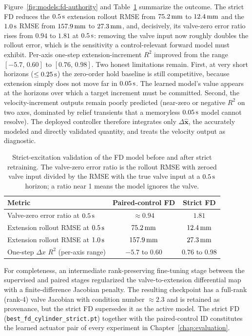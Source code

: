 Figure~\ref{fig:models:fd-authority} and Table~\ref{tab:models:fd-strict}
summarize the outcome. The strict FD reduces the $\unit[0.5]{s}$ extension
rollout RMSE from $\unit[75.2]{mm}$ to $\unit[12.4]{mm}$ and the
$\unit[1.0]{s}$ RMSE from $\unit[157.9]{mm}$ to $\unit[27.3]{mm}$, and, decisively, its valve-zero error ratio rises from $0.94$ to
$1.81$ at $\unit[0.5]{s}$: removing the valve input now roughly doubles the
rollout error, which is the sensitivity a control-relevant forward
model must exhibit. Per-axis one-step extension-increment $R^2$ improved
from the range $[-5.7,\, 0.60]$ to $[0.76,\, 0.98]$. Two honest limitations
remain. First, at very short horizons ($\leq \unit[0.25]{s}$) the zero-order
hold baseline is still competitive, because extension simply does not move
far in $\unit[0.05]{s}$. The learned model's value appears at the horizons
over which a target increment must be committed. Second, the
velocity-increment outputs remain poorly predicted (near-zero or negative
$R^2$ on two axes, dominated by relief transients that a memoryless
$\unit[0.05]{s}$ model cannot resolve). The deployed controller therefore
integrates only $\Delta\hat{\bm{x}}$, the accurately modeled and directly
validated quantity, and treats the velocity output as diagnostic.

\begin{table}[tb]
  \centering
  \caption{Strict-excitation validation of the FD model before and after
  strict retraining. The valve-zero error ratio is the rollout RMSE with
  zeroed valve input divided by the RMSE with the true valve input at a
  $\unit[0.5]{s}$ horizon; a ratio near 1 means the model ignores the valve.}
  \label{tab:models:fd-strict}
  \begin{tabular}{lcc}
    \toprule
    Metric & Paired-control FD & Strict FD \\
    \midrule
    Valve-zero error ratio at $\unit[0.5]{s}$ & $\approx 0.94$ & $1.81$ \\
    Extension rollout RMSE at $\unit[0.5]{s}$ & $\unit[75.2]{mm}$ & $\unit[12.4]{mm}$ \\
    Extension rollout RMSE at $\unit[1.0]{s}$ & $\unit[157.9]{mm}$ & $\unit[27.3]{mm}$ \\
    One-step $\Delta x$ $R^2$ (per-axis range) & $-5.7$ to $0.60$ & $0.76$ to $0.98$ \\
    \bottomrule
  \end{tabular}
\end{table}

For completeness, an intermediate rank-preserving fine-tuning stage between
the supervised and paired stages regularized the valve-to-extension
differential map with a finite-difference Jacobian penalty. The resulting
checkpoint has a full-rank (rank-4) valve Jacobian with condition number
$\approx 2.3$ and is retained as provenance, but the strict FD supersedes it
as the active model. The strict FD
(\texttt{best\_fd\_cylinder\_strict.pt}) together with the paired-control ID
constitutes the learned actuator pair of every \ppoIDFD{} experiment in
Chapter~\ref{chap:evaluation}.

